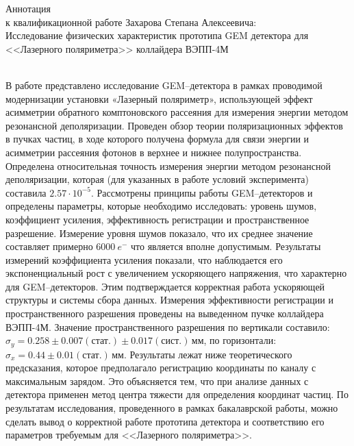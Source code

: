 \thispagestyle{empty}
\noindent 
{}
\begin{center}
{\large{Аннотация\\ к квалификационной работе Захарова Степана Алексеевича:\\Исследование физических характеристик прототипа GEM детектора для <<Лазерного поляриметра>> коллайдера ВЭПП-4М}}
\end{center}
\normalsize
{}
\vspace{10pt}
\\

В работе представлено исследование GEM--детектора в рамках проводимой модернизации установки «Лазерный поляриметр», использующей эффект асимметрии обратного комптоновского рассеяния для измерения энергии методом резонансной деполяризации. Проведен обзор теории поляризационных эффектов в пучках частиц, в ходе которого получена формула для связи энергии и асимметрии рассеяния фотонов в верхнее и нижнее полупространства. Определена относительная точность измерения энергии методом резонансной деполяризации, которая (для указанных в работе условий эксперимента) составила $2.57\cdot10^{-5}$. Рассмотрены принципы работы GEM--детекторов и определены параметры, которые необходимо исследовать: уровень шумов, коэффициент усиления, эффективность регистрации и пространственное разрешение. Измерение уровня шумов показало, что их среднее значение составляет примерно $6000~e^-$ что является вполне допустимым. Результаты измерений коэффициента усиления показали, что наблюдается его экспоненциальный рост с увеличением ускоряющего напряжения, что характерно для GEM--детекторов. Этим подтверждается корректная работа ускоряющей структуры и системы сбора данных. Измерения эффективности регистрации и пространственного разрешения проведены на выведенном пучке коллайдера ВЭПП-4М. Значение пространственного разрешения по вертикали составило: $\sigma_y = 0.258\pm0.007(\text{стат.})\pm0.017(\text{сист.})$\,мм, по горизонтали: $\sigma_x = 0.44\pm0.01(\text{стат.})$\,мм. Результаты лежат ниже теоретического предсказания, которое предполагало регистрацию координаты по каналу с максимальным зарядом. Это объясняется тем, что при анализе данных с детектора применен метод центра тяжести для определения координат частиц. По результатам исследования, проведенного в рамках бакалаврской работы, можно сделать вывод о корректной работе прототипа детектора и соответствию его параметров требуемым для <<Лазерного поляриметра>>.
\vspace*{20pt}

